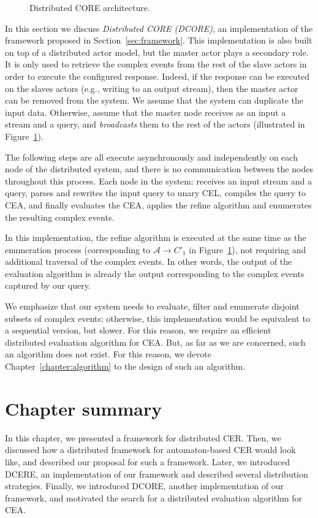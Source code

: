 \begin{figure}[H]
  \centering
  \caption{Distributed CORE architecture.}
  \label{fig:dcore}
\end{figure}

In this section we discuss \emph{Distributed CORE (DCORE)}, an implementation of the framework proposed in Section~\ref{sec:framework}. This implementation is also built on top of a distributed actor model, but the master actor plays a secondary role. It is only used to retrieve the complex events from the rest of the slave actors in order to execute the configured response. Indeed, if the response can be executed on the slaves actors (e.g., writing to an output stream), then the master actor can be removed from the system. We assume that the system can duplicate the input data. Otherwise, assume that the master node receives as an input a stream and a query, and \emph{broadcasts} them to the rest of the actors (illustrated in Figure~\ref{fig:dcore}).

The following steps are all execute asynchronously and independently on each node of the distributed system, and there is no communication between the nodes throughout this process. Each node in the system: receives an input stream and a query, parses and rewrites the input query to unary CEL, compiles the query to CEA, and finally evaluates the CEA, applies the refine algorithm and enumerates the resulting complex events.

In this implementation, the refine algorithm is executed at the same time as the enumeration process (corresponding to $\mathcal{A} \to C'_{1}$ in Figure~\ref{fig:dcore}), not requiring and additional traversal of the complex events. In other words, the output of the evaluation algorithm is already the output corresponding to the complex events captured by our query.

We emphasize that our system needs to evaluate, filter and enumerate disjoint subsets of complex events; otherwise, this implementation would be equivalent to a sequential version, but slower. For this reason, we require an efficient distributed evaluation algorithm for CEA. But, as far as we are concerned, such an algorithm does not exist. For this reason, we devote Chapter~\ref{chapter:algorithm} to the design of such an algorithm.

\section{Chapter summary}

In this chapter, we presented a framework for distributed CER. Then, we discussed how a distributed framework for automaton-based CER would look like, and described our proposal for such a framework. Later, we introduced DCERE, an implementation of our framework and described several distribution strategies. Finally, we introduced DCORE, another implementation of our framework, and motivated the search for a distributed evaluation algorithm for CEA.
